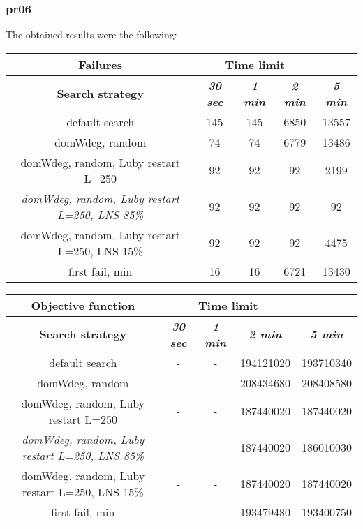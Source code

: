 \subsubsection{pr06}
The obtained results were the following:
{
\renewcommand{\arraystretch}{2}
\begin{longtable}[h]{| c | c | c | c | c |}
    \hline
    \textbf{Failures} & \multicolumn{3}{c}{Time limit} & \\
    \hline
    \textbf{Search strategy} & \textbf{\textit{30 sec}} & \textbf{\textit{1 min}} & \textbf{\textit{2 min}} & \textbf{\textit{5 min}} \\
    \hline
    \endhead
    default search                                         & 145 &  145 &  6850 &  13557 \\
    \hline
    domWdeg, random                                        &  74 &   74 &  6779 &  13486 \\
    \hline
    domWdeg, random, Luby restart L=250                    &  92 &   92 &   92 &    2199 \\
    \hline
    \textit{domWdeg, random, Luby restart L=250, LNS 85\%} &  92 &   92 &   92 &      92 \\
    \hline
    domWdeg, random, Luby restart L=250, LNS 15\%          &  92 &   92 &   92 &    4475 \\
    \hline
    first fail, min                                        &  16 &   16 & 6721 &   13430 \\
    \hline
\end{longtable}
}

{
\renewcommand{\arraystretch}{2}
\begin{longtable}[h]{| c | c | c | c | c |}
    \hline
    \textbf{Objective function} & \multicolumn{3}{c}{Time limit} & \\
    \hline
    \textbf{Search strategy} & \textbf{\textit{30 sec}} & \textbf{\textit{1 min}} & \textbf{\textit{2 min}} & \textbf{\textit{5 min}} \\
    \hline
    \endhead
    default search                                         & - & - & 194121020 & 193710340 \\
    \hline
    domWdeg, random                                        & - & - & 208434680 & 208408580 \\
    \hline
    domWdeg, random, Luby restart L=250                    & - & - & 187440020 & 187440020 \\
    \hline
    \textit{domWdeg, random, Luby restart L=250, LNS 85\%} & - & - & 187440020 & 186010030 \\
    \hline
    domWdeg, random, Luby restart L=250, LNS 15\%          & - & - & 187440020 & 187440020 \\
    \hline
    first fail, min                                        & - & - & 193479480 & 193400750 \\
    \hline
\end{longtable}
}